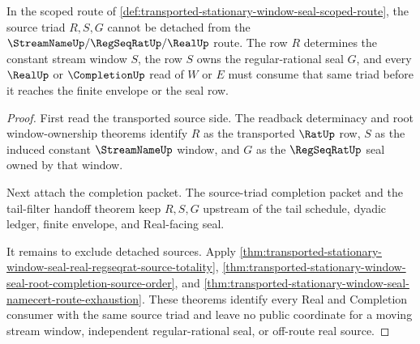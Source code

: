 \begin{theorem}
\label{thm:transported-stationary-window-seal-source-triad-scope-exhaustion}
In the scoped route of \autoref{def:transported-stationary-window-seal-scoped-route}, the source triad $R,S,G$ cannot be detached from the $\StreamNameUp/\RegSeqRatUp/\RealUp$ route. The row $R$ determines the constant stream window $S$, the row $S$ owns the regular-rational seal $G$, and every $\RealUp$ or $\CompletionUp$ read of $W$ or $E$ must consume that same triad before it reaches the finite envelope or the seal row.
\end{theorem}
\begin{proof}
First read the transported source side. The readback determinacy and root window-ownership theorems identify $R$ as the transported $\RatUp$ row, $S$ as the induced constant $\StreamNameUp$ window, and $G$ as the $\RegSeqRatUp$ seal owned by that window.

Next attach the completion packet. The source-triad completion packet and the tail-filter handoff theorem keep $R,S,G$ upstream of the tail schedule, dyadic ledger, finite envelope, and Real-facing seal.

It remains to exclude detached sources. Apply \autoref{thm:transported-stationary-window-seal-real-regseqrat-source-totality}, \autoref{thm:transported-stationary-window-seal-root-completion-source-order}, and \autoref{thm:transported-stationary-window-seal-namecert-route-exhaustion}. These theorems identify every Real and Completion consumer with the same source triad and leave no public coordinate for a moving stream window, independent regular-rational seal, or off-route real source.
\end{proof}

